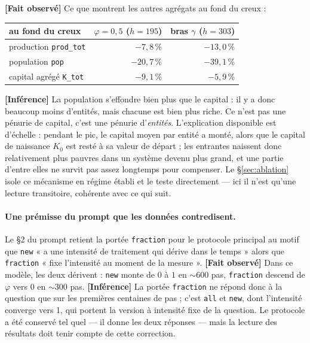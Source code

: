 \documentclass[11pt,a4paper]{article}
\newcommand{\code}[1]{\texttt{#1}}
\newcommand{\fait}{\textbf{[Fait observé]}}
\newcommand{\inference}{\textbf{[Inférence]}}
\begin{document}
\fait{} Ce que montrent les autres agrégats au fond du creux :

\begin{center}\footnotesize
\begin{tabular}{@{}lrr@{}}
\toprule
au fond du creux & $\varphi = 0{,}5$ ($h=195$) & bras $\gamma$ ($h=303$) \\
\midrule
production \code{prod\_tot} & $-7{,}8$\,\% & $-13{,}0$\,\% \\
population \code{pop}       & $-20{,}7$\,\% & $-39{,}1$\,\% \\
capital agrégé \code{K\_tot} & $-9{,}1$\,\% & $-5{,}9$\,\% \\
\bottomrule
\end{tabular}
\end{center}

\inference{} La population s'effondre bien plus que le capital : il y a donc
beaucoup moins d'entités, mais chacune est bien plus riche. Ce n'est pas une
pénurie de capital, c'est une pénurie d'\emph{entités}. L'explication
disponible est d'échelle : pendant le pic, le capital moyen par entité a
monté, alors que le capital de naissance $K_0$ est resté à sa valeur de
départ ; les entrantes naissent donc relativement plus pauvres dans un
système devenu plus grand, et une partie d'entre elles ne survit pas assez
longtemps pour compenser. Le §\ref{sec:ablation} isole ce mécanisme en
régime établi et le teste directement --- ici il n'est qu'une lecture
transitoire, cohérente avec ce qui suit.

\paragraph{Une prémisse du prompt que les données contredisent.} Le §2 du
prompt retient la portée \code{fraction} pour le protocole principal au
motif que \code{new} « a une intensité de traitement qui dérive dans le
temps » alors que \code{fraction} « fixe l'intensité au moment de la
mesure ». \fait{} Dans ce modèle, les deux dérivent : \code{new} monte de
$0$ à $1$ en $\sim$600 pas, \code{fraction} descend de $\varphi$ vers $0$
en $\sim$300 pas. \inference{} La portée \code{fraction} ne répond donc à
la question que sur les premières centaines de pas ; c'est \code{all} et
\code{new}, dont l'intensité converge vers 1, qui portent la version à
intensité fixe de la question. Le protocole a été conservé tel quel --- il
donne les deux réponses --- mais la lecture des résultats doit tenir compte
de cette correction.
\end{document}
